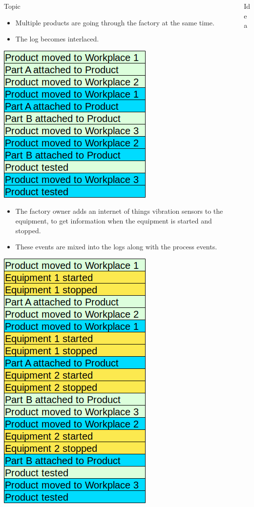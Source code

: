 \documentclass[final]{beamer}
\newlength{\sepwid}
\newlength{\onecolwid}
\begin{document}
\begin{frame}[t]
\begin{columns}[t]
\begin{column}{\onecolwid}
\begin{alertblock}{Topic}
\begin{itemize}
\item Multiple products are going through the factory at the same time.
\item The log becomes interlaced.
\end{itemize}

{\centering
\includegraphics[width=4 cm,keepaspectratio=true]{./log2.png}\par
}

\begin{itemize}
\item The factory owner adds an internet of things vibration sensors to the equipment, to get information when the equipment is started and stopped.
\item These events are mixed into the logs along with the process events.
\end{itemize}

{\centering
\includegraphics[width=4 cm,keepaspectratio=true]{./log3.png}\par
}
\end{alertblock}
\end{column}

\begin{column}{\sepwid}\end{column} %

\begin{column}{\onecolwid}
\begin{block}{Idea}


\end{block}
\end{column}
\end{columns}
\end{frame}
\end{document}
